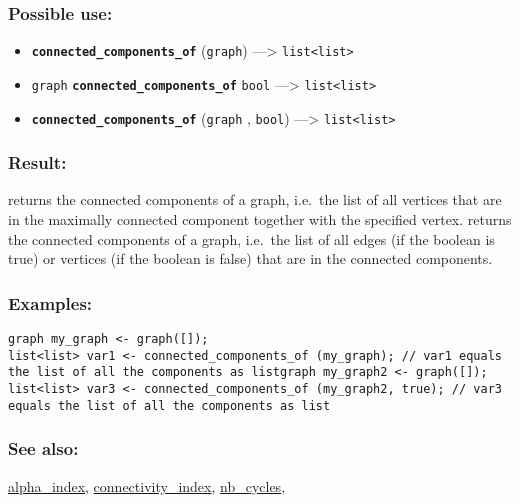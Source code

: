 \documentclass[]{book}
\providecommand{\tightlist}{%
  \setlength{\itemsep}{0pt}\setlength{\parskip}{0pt}}
\theoremstyle{definition}
\theoremstyle{definition}
\theoremstyle{definition}
\theoremstyle{remark}
\begin{document}
\subsubsection{Possible use:}\label{possible-use-96}

\begin{itemize}
\tightlist
\item
  \textbf{\texttt{connected\_components\_of}} (\texttt{graph})
  ---\textgreater{} \texttt{list\textless{}list\textgreater{}}
\item
  \texttt{graph} \textbf{\texttt{connected\_components\_of}}
  \texttt{bool} ---\textgreater{}
  \texttt{list\textless{}list\textgreater{}}
\item
  \textbf{\texttt{connected\_components\_of}} (\texttt{graph} ,
  \texttt{bool}) ---\textgreater{}
  \texttt{list\textless{}list\textgreater{}}
\end{itemize}

\subsubsection{Result:}\label{result-94}

returns the connected components of a graph, i.e.~the list of all
vertices that are in the maximally connected component together with the
specified vertex. returns the connected components of a graph, i.e.~the
list of all edges (if the boolean is true) or vertices (if the boolean
is false) that are in the connected components.

\subsubsection{Examples:}\label{examples-74}

\begin{verbatim}
graph my_graph <- graph([]);  
list<list> var1 <- connected_components_of (my_graph); // var1 equals the list of all the components as listgraph my_graph2 <- graph([]);  
list<list> var3 <- connected_components_of (my_graph2, true); // var3 equals the list of all the components as list
\end{verbatim}

\subsubsection{See also:}\label{see-also-60}

\href{OperatorsAA\#alpha_index}{alpha\_index},
\href{OperatorsBC\#connectivity_index}{connectivity\_index},
\href{OperatorsNR\#nb_cycles}{nb\_cycles},
\end{document}
